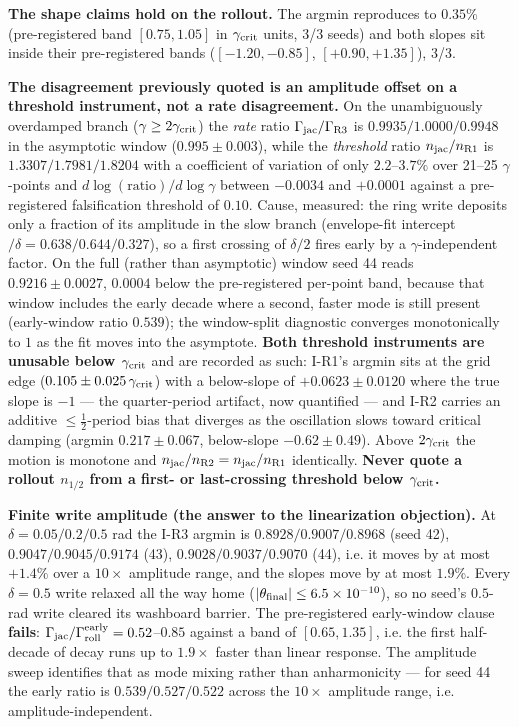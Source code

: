 \documentclass{article}
\begin{document}
\textbf{The shape claims hold on the rollout.} The argmin reproduces to $0.35\%$ (pre-registered band $[0.75,1.05]$ in $\gamma_{\rm crit}$ units, 3/3 seeds) and both slopes sit inside their pre-registered bands ($[-1.20,-0.85]$, $[+0.90,+1.35]$), 3/3.

\textbf{The disagreement previously quoted is an amplitude offset on a threshold instrument, not a rate disagreement.} On the unambiguously overdamped branch ($\gamma\ge2\gamma_{\rm crit}$) the \emph{rate} ratio $\Gamma_{\rm jac}/\Gamma_{\rm R3}$ is $0.9935/1.0000/0.9948$ in the asymptotic window ($0.995\pm0.003$), while the \emph{threshold} ratio $n_{\rm jac}/n_{\rm R1}$ is $1.3307/1.7981/1.8204$ with a coefficient of variation of only $2.2$--$3.7\%$ over 21--25 $\gamma$-points and $d\log(\text{ratio})/d\log\gamma$ between $-0.0034$ and $+0.0001$ against a pre-registered falsification threshold of $0.10$. Cause, measured: the ring write deposits only a fraction of its amplitude in the slow branch (envelope-fit intercept $/\delta=0.638/0.644/0.327$), so a first crossing of $\delta/2$ fires early by a $\gamma$-independent factor. On the full (rather than asymptotic) window seed 44 reads $0.9216\pm0.0027$, $0.0004$ below the pre-registered per-point band, because that window includes the early decade where a second, faster mode is still present (early-window ratio $0.539$); the window-split diagnostic converges monotonically to $1$ as the fit moves into the asymptote. \textbf{Both threshold instruments are unusable below $\gamma_{\rm crit}$} and are recorded as such: I-R1's argmin sits at the grid edge ($0.105\pm0.025\,\gamma_{\rm crit}$) with a below-slope of $+0.0623\pm0.0120$ where the true slope is $-1$ --- the quarter-period artifact, now quantified --- and I-R2 carries an additive $\le\frac12$-period bias that diverges as the oscillation slows toward critical damping (argmin $0.217\pm0.067$, below-slope $-0.62\pm0.49$). Above $2\gamma_{\rm crit}$ the motion is monotone and $n_{\rm jac}/n_{\rm R2}=n_{\rm jac}/n_{\rm R1}$ identically. \textbf{Never quote a rollout $n_{1/2}$ from a first- or last-crossing threshold below $\gamma_{\rm crit}$.}

\textbf{Finite write amplitude (the answer to the linearization objection).} At $\delta=0.05/0.2/0.5$ rad the I-R3 argmin is $0.8928/0.9007/0.8968$ (seed 42), $0.9047/0.9045/0.9174$ (43), $0.9028/0.9037/0.9070$ (44), i.e. it moves by at most $+1.4\%$ over a $10\times$ amplitude range, and the slopes move by at most $1.9\%$. Every $\delta=0.5$ write relaxed all the way home ($|\theta_{\rm final}|\le6.5\times10^{-10}$), so no seed's $0.5$-rad write cleared its washboard barrier. The pre-registered early-window clause \textbf{fails}: $\Gamma_{\rm jac}/\Gamma^{\rm early}_{\rm roll}=0.52$--$0.85$ against a band of $[0.65,1.35]$, i.e. the first half-decade of decay runs up to $1.9\times$ faster than linear response. The amplitude sweep identifies that as mode mixing rather than anharmonicity --- for seed 44 the early ratio is $0.539/0.527/0.522$ across the $10\times$ amplitude range, i.e. amplitude-independent.
\end{document}
